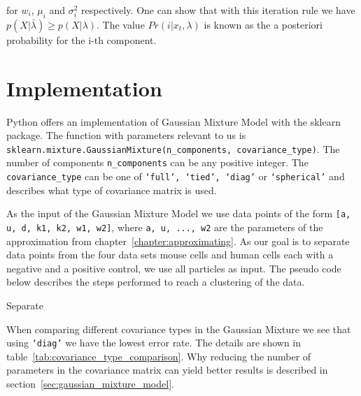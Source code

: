 for $w_i$, $\mu_i$ and $\sigma_i^2$ respectively. One can show that with this iteration rule we have $p(X|\bar{\lambda}) \geq p(X|\lambda)$. The value $Pr(i|x_t, \lambda)$ is known as the a posteriori probability for the i-th component.


\section{Implementation}

Python offers an implementation of Gaussian Mixture Model with the sklearn package. The function with parameters relevant to us is \texttt{sklearn.mixture.GaussianMixture(n\_components, covariance\_type)}. The number of components \texttt{n\_components} can be any positive integer. The \texttt{covariance\_type} can be one of \texttt{‘full’, ‘tied’, ‘diag’} or \texttt{‘spherical’} and describes what type of covariance matrix is used.

As the input of the Gaussian Mixture Model we use data points of the form \texttt{[a, u, d, k1, k2, w1, w2]}, where \texttt{a, u, ..., w2} are the parameters of the approximation from chapter~\ref{chapter:approximating}. As our goal is to separate data points from the four data sets mouse cells and human cells each with a negative and a positive control, we use all particles as input. The pseudo code below describes the steps performed to reach a clustering of the data.

\begin{algorithm}[H] \label{alg:separate}
	\SetAlgoLined
	\DontPrintSemicolon
	\LinesNumbered
	\caption{Separate}
	
	
	\BlankLine
\end{algorithm}
\vspace{1cm}

When comparing different covariance types in the Gaussian Mixture we see that using \texttt{‘diag’} we have the lowest error rate. The details are shown in table~\ref{tab:covariance_type_comparison}. Why reducing the number of parameters in the covariance matrix can yield better results is described in section~\ref{sec:gaussian_mixture_model}.

